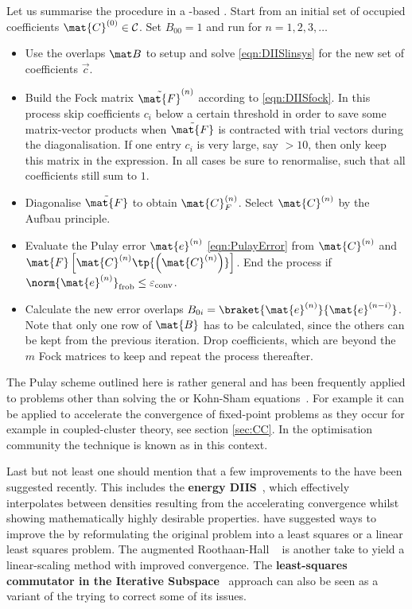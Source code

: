 Let us summarise the procedure in a \contract-based \SCF.
Start from an initial set of occupied coefficients $\mat{C}^{(0)} \in \mathcal{C}$.
Set $B_{00} = 1$ and run for $n=1, 2, 3, \ldots$
\begin{itemize}
	\item Use the overlaps $\mat B$ to setup and solve \eqref{eqn:DIISlinsys}
		for the new set of \DIIS coefficients $\vec{c}$.
	\item Build the Fock matrix $\tilde{\mat{F}}^{(n)}$
		according to \eqref{eqn:DIISfock}.
		In this process skip coefficients $c_i$ below a certain threshold
		in order to save some matrix-vector products when
		$\tilde{\mat{F}}$ is contracted with trial vectors during
		the diagonalisation.
		If one entry $c_i$ is very large, say $>10$,
		then only keep this matrix in the expression.
		In all cases be sure to renormalise,
		such that all coefficients still sum to $1$.
	\item Diagonalise $\tilde{\mat{F}}$
		to obtain $\mat{C}_F^{(n)}$.
		Select $\mat{C}^{(n)}$ by the Aufbau principle.
	\item Evaluate the Pulay error $\mat{e}^{(n)}$ \eqref{eqn:PulayError}
		from $\mat{C}^{(n)}$ and
		$\mat{F}\left[\mat{C}^{(n)} \tp{\left(\mat{C}^{(n)}\right)} \right]$.
		End the process if $\norm{\mat{e}^{(n)}}_\text{frob} \leq \epsilonconv$.
	\item Calculate the new error overlaps
		$B_{0i} = \braket{\mat{e}^{(n)}}{\mat{e}^{(n-i)}}$.
		Note that only one row of $\mat{B}$ has to be calculated,
		since the others can be kept from the previous \SCF iteration.
		Drop coefficients, which are beyond the $m$ Fock matrices to keep
		and repeat the process thereafter.
\end{itemize}
The Pulay \DIIS scheme outlined here is rather general
and has been frequently applied to problems
other than solving the \HF or Kohn-Sham equations~\cite{Hamilton1986}.
For example it can be applied to accelerate
the convergence of fixed-point problems
as they occur for example in coupled-cluster theory,
see section \vref{sec:CC}.
In the optimisation community the \DIIS technique is known as
 in this context.

Last but not least one should mention that a few
improvements to the \DIIS have been suggested recently.
This includes the \textbf{energy DIIS}~\cite{Kudin2002},
which effectively interpolates between densities resulting
from the \ODA accelerating \ODA convergence
whilst showing mathematically highly desirable properties.
\citet{Shepard2007} have suggested ways to improve the \DIIS
by reformulating the original problem into a least squares
or a linear least squares problem.
The augmented Roothaan-Hall \DIIS~\cite{Hoest2008} is another take
to yield a linear-scaling method with improved convergence.
The
\textbf{least-squares commutator in the Iterative Subspace}~\cite{Li2016} approach
can also be seen as a variant of the \DIIS
trying to correct some of its issues.

